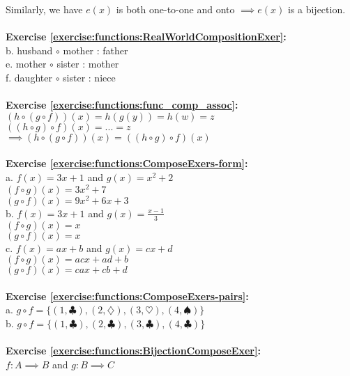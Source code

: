 Similarly, we have $e(x)$ is both one-to-one and onto $\implies e(x)$ is a bijection.\\
\\
\textbf{Exercise \ref{exercise:functions:RealWorldCompositionExer}:}\\
b. husband $\circ$ mother : father\\
e. mother $\circ$ sister : mother\\
f. daughter $\circ$ sister : niece\\
\\
\textbf{Exercise \ref{exercise:functions:func_comp_assoc}:}\\
$(h\circ(g\circ f))(x)=h(g(y))=h(w)=z$\\
$((h\circ g)\circ f)(x)=...=z$\\
$\implies (h\circ(g\circ f))(x)=((h\circ g)\circ f)(x)$\\
\\
\textbf{Exercise \ref{exercise:functions:ComposeExers-form}:}\\
a. $f(x)=3x+1$ and $g(x)=x^2+2$\\
$(f\circ g)(x)=3x^2+7$\\
$(g\circ f)(x)=9x^2+6x+3$\\
b. $f(x)=3x+1$ and $g(x)=\displaystyle\frac{x-1}{3}$\\
$(f\circ g)(x)=x$\\
$(g\circ f)(x)=x$\\
c. $f(x)=ax+b$ and $g(x)=cx+d$\\
$(f\circ g)(x)=acx+ad+b$\\
$(g\circ f)(x)=cax+cb+d$\\
\\
\textbf{Exercise \ref{exercise:functions:ComposeExers-pairs}:}\\
a. $g\circ f=\{(1,\clubsuit),(2,\diamondsuit),(3,\heartsuit),(4,\spadesuit)\}$\\
b. $g\circ f=\{(1,\clubsuit),(2,\clubsuit),(3,\clubsuit),(4,\clubsuit)\}$\\
\\
\textbf{Exercise \ref{exercise:functions:BijectionComposeExer}:}\\
$f: A\implies B$ and $g: B\implies C$\\
